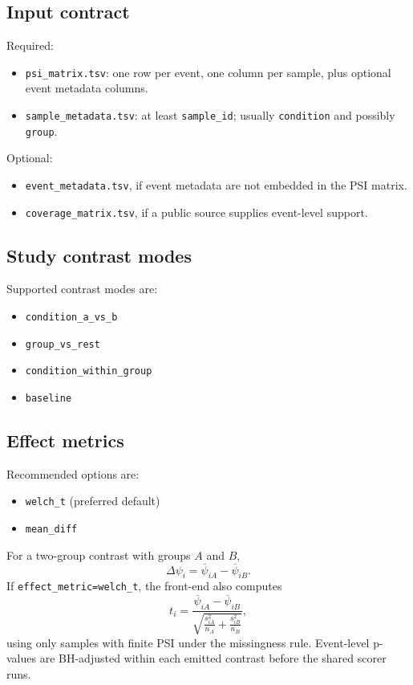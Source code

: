 \documentclass[11pt]{article}
\begin{document}
\subsection{Input contract}
Required:
\begin{itemize}[leftmargin=2em]
\item \texttt{psi\_matrix.tsv}: one row per event, one column per sample, plus optional event metadata columns.
\item \texttt{sample\_metadata.tsv}: at least \texttt{sample\_id}; usually \texttt{condition} and possibly \texttt{group}.
\end{itemize}

Optional:
\begin{itemize}[leftmargin=2em]
\item \texttt{event\_metadata.tsv}, if event metadata are not embedded in the PSI matrix.
\item \texttt{coverage\_matrix.tsv}, if a public source supplies event-level support.
\end{itemize}

\subsection{Study contrast modes}
Supported contrast modes are:
\begin{itemize}[leftmargin=2em]
\item \texttt{condition\_a\_vs\_b}
\item \texttt{group\_vs\_rest}
\item \texttt{condition\_within\_group}
\item \texttt{baseline}
\end{itemize}

\subsection{Effect metrics}
Recommended options are:
\begin{itemize}[leftmargin=2em]
\item \texttt{welch\_t} (preferred default)
\item \texttt{mean\_diff}
\end{itemize}

For a two-group contrast with groups $A$ and $B$,
\[
\Delta \psi_i = \overline{\psi}_{iA} - \overline{\psi}_{iB}.
\]
If \texttt{effect\_metric=welch\_t}, the front-end also computes
\[
t_i = \frac{\overline{\psi}_{iA} - \overline{\psi}_{iB}}{\sqrt{\frac{s_{iA}^2}{n_A} + \frac{s_{iB}^2}{n_B}}},
\]
using only samples with finite PSI under the missingness rule. Event-level p-values are BH-adjusted within each emitted contrast before the shared scorer runs.
\end{document}
